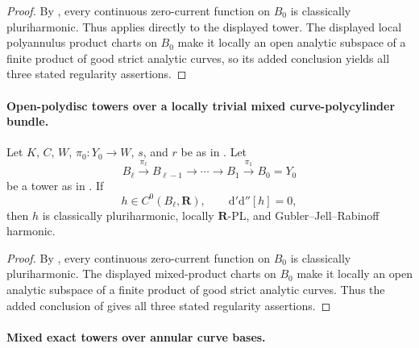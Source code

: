 \begin{proof}
By , every continuous
zero-current function on \(B_0\) is classically pluriharmonic.  Thus
 applies directly
to the displayed tower.  The displayed local polyannulus product charts on
\(B_0\) make it locally an open analytic subspace of a finite product of
good strict analytic curves, so its added conclusion yields all three
stated regularity assertions.
\end{proof}

\paragraph{Open-polydisc towers over a locally trivial mixed curve-polycylinder bundle.}
\begin{corollary}
\label{cor:p062-mixed-open-polycylinder-bundle-open-polydisc-towers}
Let \(K\), \(C\), \(W\), \(\pi_0:Y_0\to W\), \(s\), and \(r\) be as in
.  Let
\[
 B_\ell\xrightarrow{\pi_\ell}B_{\ell-1}
 \longrightarrow\cdots\longrightarrow B_1
 \xrightarrow{\pi_1}B_0=Y_0
\]
be a tower as in
.  If
\[
 h\in C^0(B_\ell,\mathbf R),
 \qquad \mathrm d'\mathrm d''[h]=0,
\]
then \(h\) is classically pluriharmonic, locally \(\mathbf R\)-PL, and
Gubler--Jell--Rabinoff harmonic.
\end{corollary}

\begin{proof}
By , every
continuous zero-current function on \(B_0\) is classically pluriharmonic.
The displayed mixed-product charts on \(B_0\) make it locally an open
analytic subspace of a finite product of good strict analytic curves.
Thus the added conclusion of
 gives all three
stated regularity assertions.
\end{proof}

\paragraph{Mixed exact towers over annular curve bases.}



